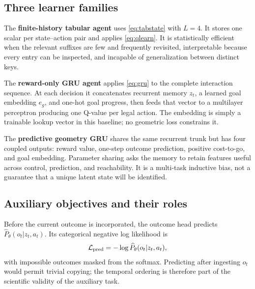 \documentclass[11pt]{article}
\begin{document}
\subsection{Three learner families}

The \textbf{finite-history tabular agent} uses \cref{eq:tabstate} with $L=4$.
It stores one scalar per state--action pair and applies
\cref{eq:qlearn}. It is statistically efficient when the relevant suffixes are
few and frequently revisited, interpretable because every entry can be
inspected, and incapable of generalization between distinct keys.

The \textbf{reward-only GRU agent} applies \cref{eq:gru} to the complete
interaction sequence. At each decision it concatenates recurrent memory
$z_t$, a learned goal embedding $e_g$, and one-hot goal progress, then feeds
that vector to a multilayer perceptron producing one Q-value per legal action.
The embedding is simply a trainable lookup vector in this baseline; no
geometric loss constrains it.

The \textbf{predictive geometry GRU} shares the same recurrent trunk but has
four coupled outputs: reward value, one-step outcome prediction, positive
cost-to-go, and goal embedding. Parameter sharing asks the memory to retain
features useful across control, prediction, and reachability. It is a
multi-task inductive bias, not a guarantee that a unique latent state will be
identified.

\subsection{Auxiliary objectives and their roles}

Before the current outcome is incorporated, the outcome head predicts
$\widehat P_\theta(o_t|z_t,a_t)$. Its categorical negative log likelihood is
\begin{equation}
 \mathcal L_{\rm pred}=-\log\widehat P_\theta(o_t|z_t,a_t),
\end{equation}
with impossible outcomes masked from the softmax. Predicting after ingesting
$o_t$ would permit trivial copying; the temporal ordering is therefore part of
the scientific validity of the auxiliary task.
\end{document}
